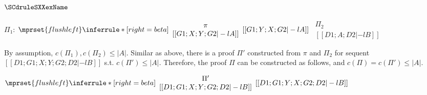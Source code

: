 \subsubsection{$\SCdruleSXXexName$}
\begin{center}
  \scriptsize
  $\Pi_1$:
  \begin{math}
    $$\mprset{flushleft}
    \inferrule* [right={\tiny beta}] {
      {
        \begin{array}{c}
          \pi \\
          {[[G1; X; Y; G2 |-l A]]}
        \end{array}
      }
    }{[[G1; Y; X; G2 |-l A]]}
  \end{math}
  \qquad\qquad
  \begin{math}
    \begin{array}{c}
      \Pi_2 \\
      {[[D1; A; D2 |-l B]]}
    \end{array}
  \end{math}
\end{center}
By assumption, $c(\Pi_1),c(\Pi_2)\leq |A|$. Similar as above, there
is a proof $\Pi'$ constructed from $\pi$ and $\Pi_2$ for sequent
$[[D1; G1; X; Y; G2; D2 |-l B]]$ s.t. $c(\Pi')\leq|A|$. Therefore,
the proof $\Pi$ can be constructed as follows, and
$c(\Pi)=c(\Pi')\leq|A|$.
\begin{center}
  \scriptsize
  \begin{math}
    $$\mprset{flushleft}
    \inferrule* [right={\tiny beta}] {
      {
        \begin{array}{cc}
          \Pi' \\
          {[[D1; G1; X; Y; G2; D2 |-l B]]}
        \end{array}
      }
    }{[[D1; G1; Y; X; G2; D2 |-l B]]}
  \end{math}
\end{center}





